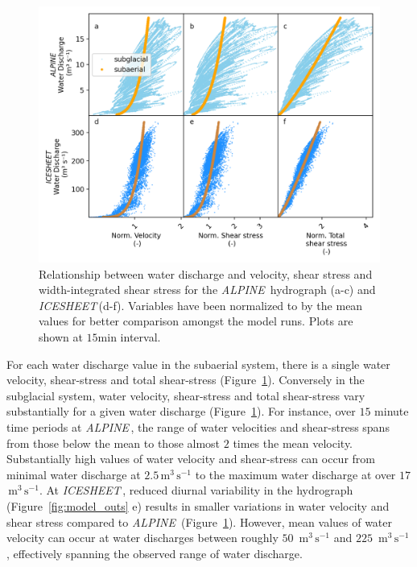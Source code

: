 \documentclass[11pt]{article}
\newcommand{\alpine}{\textit{ALPINE}\,}
\newcommand{\icesheet}{\textit{ICESHEET}\,}
\newcommand{\unit}[1]{$\mathrm{#1}$}
\begin{document}
\begin{center}
  \begin{figure}[h]
    \includegraphics[width=0.8\linewidth]{Fig3.png}
    \caption{Relationship between water discharge and velocity, shear stress and width-integrated shear stress for the \alpine{} hydrograph (a-c) and \icesheet (d-f). Variables have been normalized to by the mean values for better comparison amongst the model runs.
      Plots are shown at $15$\unit{min} interval.} 
    \label{fig:Qw_vari}
  \end{figure}
\end{center}

For each water discharge value in the subaerial system, there is a single water velocity, shear-stress and total shear-stress (Figure~\ref{fig:Qw_vari}).
Conversely in the subglacial system,  water velocity, shear-stress and total shear-stress vary substantially for a given water discharge (Figure~\ref{fig:Qw_vari}).
For instance, over $15$ minute time periods at \alpine{}, the range of water velocities and shear-stress spans from those below the mean to those almost $2$ times the mean velocity.
Substantially high values of water velocity and shear-stress can occur from minimal water discharge at $2.5$\,\unit{m}$^3$\,\unit{s}$^{-1}$ to the maximum water discharge at over $17$ \,\unit{m}$^3$\,\unit{s}$^{-1}$.
At \icesheet, reduced diurnal variability in the hydrograph  (Figure~\ref{fig:model_outs} e) results in smaller variations in water velocity and shear stress compared to \alpine{} (Figure~\ref{fig:Qw_vari}).
However, mean values of water velocity can occur at water discharges between roughly $50$ \,\unit{m}$^3$\,\unit{s}$^{-1}$ and $225$ \,\unit{m}$^3$\,\unit{s}$^{-1}$, effectively spanning the observed range of water discharge. 
\end{document}
